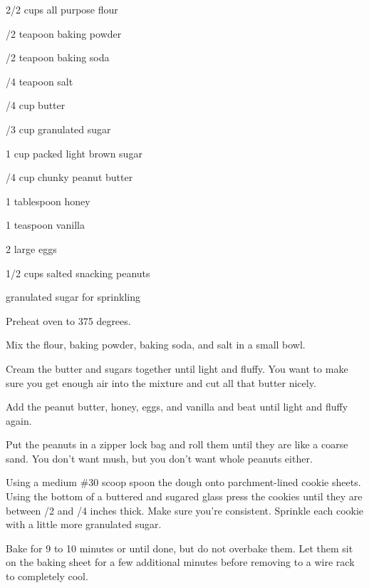 \begin{IngredientsAndSteps}
    \ListIngredientsAndSteps
    {
        2/2 cups all purpose flour

        /2 teapoon baking powder

        /2 teapoon baking soda

        /4 teapoon salt

        \IngredientsSeparatorClear

        /4 cup butter

        /3 cup granulated sugar

        1 cup packed light brown sugar

        /4 cup chunky peanut butter

        1 tablespoon honey

        1 teaspoon vanilla

        2 large eggs

        \IngredientsSeparatorClear

        1/2 cups salted snacking peanuts

        granulated sugar for sprinkling
    }
    {
        Preheat oven to 375 degrees.

        Mix the flour, baking powder, baking soda, and salt in a small bowl.

        Cream the butter and sugars together until light and fluffy. You want to make sure you get
        enough air into the mixture and cut all that butter nicely.

        Add the peanut butter, honey, eggs, and vanilla and beat until light and fluffy again.

        Put the peanuts in a zipper lock bag and roll them until they are like a coarse sand. You
        don't want mush, but you don't want whole peanuts either.

        Using a medium \#30 scoop spoon the dough onto parchment-lined cookie sheets. Using
        the bottom of a buttered and sugared glass press the cookies until they are between /2
        and /4 inches thick. Make sure you're consistent. Sprinkle each cookie with a little
        more granulated sugar.

        Bake for 9 to 10 minutes or until done, but do not overbake them. Let them sit on the baking
        sheet for a few additional minutes before removing to a wire rack to completely cool.
    }
\end{IngredientsAndSteps}

